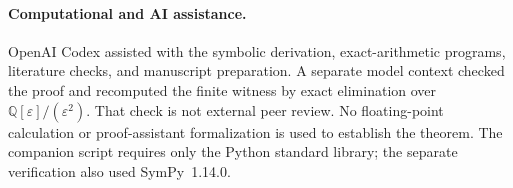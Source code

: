 \documentclass[11pt]{article}
\newcommand{\Q}{\mathbb{Q}}
\begin{document}
\paragraph{Computational and AI assistance.}
OpenAI Codex assisted with the symbolic derivation, exact-arithmetic
programs, literature checks, and manuscript preparation. A separate model
context checked the proof and recomputed the finite witness by exact
elimination over $\Q[\varepsilon]/(\varepsilon^2)$. That check is not
external peer review. No floating-point calculation or proof-assistant
formalization is used to establish the theorem. The companion script
requires only the Python standard library; the separate verification
also used SymPy~1.14.0.



\end{document}
